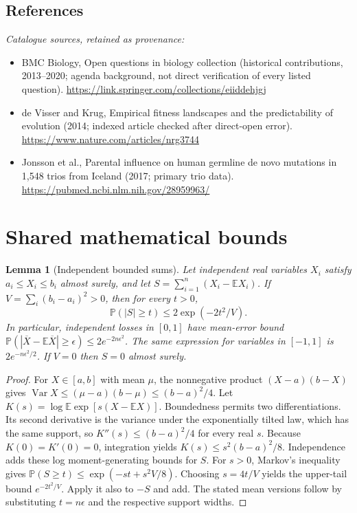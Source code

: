 \documentclass[11pt]{article}
\newcommand{\E}{\mathbb E}
\newcommand{\Prob}{\mathbb P}
\DeclareMathOperator{\Var}{Var}
\providecommand{\E}{\mathbb E}
\providecommand{\Prob}{\mathbb P}
\providecommand{\Var}{\operatorname{Var}}
\newtheorem{sharedlemma}{Lemma}[section]
\begin{document}
\subsection{References}
\noindent\emph{Catalogue sources, retained as provenance:}
\begin{itemize}
\item BMC Biology, Open questions in biology collection (historical contributions, 2013--2020; agenda background, not direct verification of every listed question). \url{https://link.springer.com/collections/eiiddehjgj}
\item de Visser and Krug, Empirical fitness landscapes and the predictability of evolution (2014; indexed article checked after direct-open error). \url{https://www.nature.com/articles/nrg3744}
\item Jonsson et al., Parental influence on human germline de novo mutations in 1,548 trios from Iceland (2017; primary trio data). \url{https://pubmed.ncbi.nlm.nih.gov/28959963/}
\end{itemize}
\clearpage


\appendix
\section{Shared mathematical bounds}\label{app:bounds}
\begin{sharedlemma}[Independent bounded sums]\label{lem:bounded}
Let independent real variables $X_i$ satisfy $a_i\leq X_i\leq b_i$ almost surely,
and let $S=\sum_{i=1}^n(X_i-\E X_i)$. If
$V=\sum_i(b_i-a_i)^2>0$, then for every $t>0$,
\[
 \Prob(|S|\geq t)\leq 2\exp(-2t^2/V).
\]
In particular, independent losses in $[0,1]$ have mean-error bound
$\Prob(|\overline X-\E\overline X|\geq\epsilon)
\leq2e^{-2n\epsilon^2}$. The same expression for variables in $[-1,1]$
is $2e^{-n\epsilon^2/2}$. If $V=0$ then $S=0$ almost surely.
\end{sharedlemma}
\begin{proof}
For $X\in[a,b]$ with mean $\mu$, the nonnegative product
$(X-a)(b-X)$ gives
$\Var X\leq(\mu-a)(b-\mu)\leq(b-a)^2/4$.
Let $K(s)=\log\E\exp[s(X-\E X)]$.
Boundedness permits two differentiations. Its second derivative is the variance
under the exponentially tilted law, which has the same support, so
$K''(s)\leq(b-a)^2/4$ for every real $s$.
Because $K(0)=K'(0)=0$, integration yields
$K(s)\leq s^2(b-a)^2/8$.
Independence adds these log moment-generating bounds for $S$.
For $s>0$, Markov's inequality gives
$\Prob(S\geq t)\leq\exp(-st+s^2V/8)$.
Choosing $s=4t/V$ yields the upper-tail bound $e^{-2t^2/V}$.
Apply it also to $-S$ and add. The stated mean versions follow by substituting
$t=n\epsilon$ and the respective support widths.
\end{proof}
\end{document}
